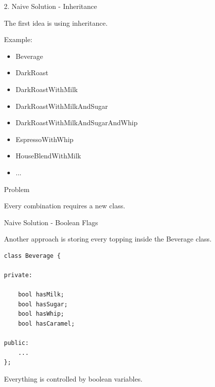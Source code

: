 \documentclass[aspectratio=169]{beamer}
\begin{document}
\begin{frame}{2. Naive Solution - Inheritance}

The first idea is using inheritance.

\bigskip

Example:

\begin{itemize}

\item Beverage

\item DarkRoast

\item DarkRoastWithMilk

\item DarkRoastWithMilkAndSugar

\item DarkRoastWithMilkAndSugarAndWhip

\item EspressoWithWhip

\item HouseBlendWithMilk

\item ...

\end{itemize}

\pause

\begin{alertblock}{Problem}

Every combination requires a new class.

\end{alertblock}

\end{frame}


\begin{frame}[fragile]{Naive Solution - Boolean Flags}

Another approach is storing every topping inside the Beverage class.

\bigskip

\begin{lstlisting}
class Beverage {

private:

    bool hasMilk;
    bool hasSugar;
    bool hasWhip;
    bool hasCaramel;

public:
    ...
};
\end{lstlisting}

\pause

Everything is controlled by boolean variables.

\end{frame}
\end{document}
